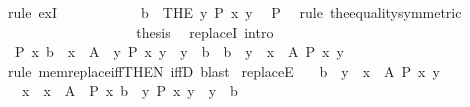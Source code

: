 \begin{isabellebody}
\ {\isacharparenleft}{\kern0pt}rule\ ex{}I{\isacharparenright}{\kern0pt}\isanewline
\ \ \ \ \ \ \ \ \isamarkupfalse%
\ \isamarkupfalse%
\ {\isachardoublequoteopen}b\ {\isacharequal}{\kern0pt}\ {\isacharparenleft}{\kern0pt}THE\ y{\isachardot}{\kern0pt}\ P\ x\ y{\isacharparenright}{\kern0pt}{\isachardoublequoteclose}\ \isamarkupfalse%
\ P\ \isamarkupfalse%
\ {\isacharparenleft}{\kern0pt}rule\ the{}{\isacharunderscore}{\kern0pt}equality{\isacharbrackleft}{\kern0pt}symmetric{\isacharbrackright}{\kern0pt}{\isacharparenright}{\kern0pt}\isanewline
\ \ \ \ \ \ \isamarkupfalse%
\isanewline
\ \ \ \ \isamarkupfalse%
\isanewline
\ \ \isamarkupfalse%
\isanewline
\ \ \isamarkupfalse%
\ \isamarkupfalse%
\ {\isacharquery}{\kern0pt}thesis\ \isacommand{{\isachardot}{\kern0pt}}\isamarkupfalse%
\isanewline
{}\isamarkupfalse%
%
\endisatagproof
{\isafoldproof}%
%
\isadelimproof
\isanewline
%
\endisadelimproof
\isanewline
\isanewline
{}\isamarkupfalse%
\ replaceI\ {\isacharbrackleft}{\kern0pt}intro{\isacharbang}{\kern0pt}{\isacharbrackright}{\kern0pt}{\isacharcolon}{\kern0pt}\isanewline
\ \ {\isachardoublequoteopen}{\isasymlbrakk}P\ x\ b{\isacharsemicolon}{\kern0pt}\ \ x\ {\isasymin}\ A{\isacharsemicolon}{\kern0pt}\ \ {\isasymAnd}y{\isachardot}{\kern0pt}\ P\ x\ y\ {\isasymLongrightarrow}\ y\ {\isacharequal}{\kern0pt}\ b{\isasymrbrakk}\ {\isasymLongrightarrow}\ b\ {\isasymin}\ {\isacharbraceleft}{\kern0pt}y\ {\isacharbar}{\kern0pt}\ x\ {\isasymin}\ A{\isacharcomma}{\kern0pt}\ P\ x\ y{\isacharbraceright}{\kern0pt}{\isachardoublequoteclose}\isanewline
%
\isadelimproof
\ \ %
\endisadelimproof
%
\isatagproof
{}\isamarkupfalse%
\ {\isacharparenleft}{\kern0pt}rule\ mem{\isacharunderscore}{\kern0pt}replace{\isacharunderscore}{\kern0pt}iff{\isacharbrackleft}{\kern0pt}THEN\ iffD{}{\isacharbrackright}{\kern0pt}{\isacharparenright}{\kern0pt}\ blast%
\endisatagproof
{\isafoldproof}%
%
\isadelimproof
\isanewline
%
\endisadelimproof
\isanewline
\isanewline
{}\isamarkupfalse%
\ replaceE{\isacharcolon}{\kern0pt}\isanewline
\ \ \ {\isachardoublequoteopen}b\ {\isasymin}\ {\isacharbraceleft}{\kern0pt}y\ {\isacharbar}{\kern0pt}\ x\ {\isasymin}\ A{\isacharcomma}{\kern0pt}\ P\ x\ y{\isacharbraceright}{\kern0pt}{\isachardoublequoteclose}\isanewline
\ \ \ x\ \ {\isachardoublequoteopen}x\ {\isasymin}\ A{\isachardoublequoteclose}\ \ {\isachardoublequoteopen}P\ x\ b{\isachardoublequoteclose}\ \ {\isachardoublequoteopen}{\isasymAnd}y{\isachardot}{\kern0pt}\ P\ x\ y\ {\isasymLongrightarrow}\ y\ {\isacharequal}{\kern0pt}\ b{\isachardoublequoteclose}\isanewline

\end{isabellebody}
